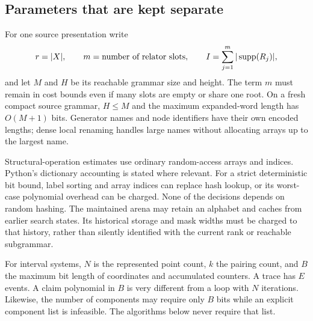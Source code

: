 \subsection{Parameters that are kept separate}

For one source presentation write
\[
 r=|X|,\qquad m=\text{number of relator slots},\qquad
 I=\sum_{j=1}^{m}|\operatorname{supp}(R_j)|,
\]
and let $M$ and $H$ be its reachable grammar size and height. The term $m$
must remain in cost bounds even if many slots are empty or share one root.
On a fresh compact source grammar, $H\le M$ and the maximum expanded-word
length has $O(M+1)$ bits. Generator names and node identifiers have their
own encoded lengths; dense local renaming handles large names without
allocating arrays up to the largest name.

Structural-operation estimates use ordinary random-access arrays and
indices. Python's dictionary accounting is stated where relevant. For a
strict deterministic bit bound, label sorting and array indices can replace
hash lookup, or its worst-case polynomial overhead can be charged. None of
the decisions depends on random hashing. The maintained arena may retain
an alphabet and caches from earlier search states. Its historical storage
and mask widths must be charged to that history, rather than silently
identified with the current rank or reachable subgrammar.

For interval systems, $N$ is the represented point count, $k$ the pairing
count, and $B$ the maximum bit length of coordinates and accumulated
counters. A trace has $E$ events. A claim polynomial in $B$ is very
different from a loop with $N$ iterations. Likewise, the number of
components may require only $B$ bits while an explicit component list is
infeasible. The algorithms below never require that list.

